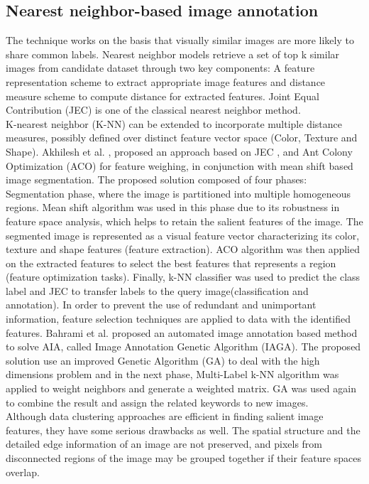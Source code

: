 \documentclass[conference]{IEEEtran}
\begin{document}
	\subsection{Nearest neighbor-based image annotation}
		The technique works on the basis that visually similar images are more likely to share
common labels. Nearest neighbor models retrieve a set of top k similar images from
candidate dataset through two key components: A feature representation scheme to
extract appropriate image features and distance measure scheme to compute distance for
extracted features. Joint Equal Contribution (JEC)\cite{b6} is one of the classical nearest neighbor method.\\
		
		K-nearest neighbor (K-NN) can be extended to incorporate multiple distance measures,
possibly defined over distinct feature vector space (Color, Texture and Shape). Akhilesh
et al. \cite{b7}, proposed an approach based on JEC \cite{b6}, and Ant Colony
Optimization (ACO) for feature weighing, in conjunction with mean shift based image
segmentation. The proposed solution composed of four phases: Segmentation phase, where
the image is partitioned into multiple homogeneous regions. Mean shift algorithm\cite{meanShift} was
used in this phase due to its robustness in feature space analysis, which
helps to retain the salient features of the image. The segmented image is represented as a
visual feature vector characterizing its color, texture and shape features (feature extraction).
ACO algorithm was then applied on the extracted features to select the best features that
represents a region (feature optimization tasks). Finally, k-NN classifier was used to predict
the class label and JEC to transfer labels to the query image(classification and annotation).
In order to prevent the use of redundant and unimportant information, feature selection
techniques are applied to data with the identified features. Bahrami et al.\cite{IAGA} proposed
an automated image annotation based method to solve AIA, called Image Annotation
Genetic Algorithm (IAGA). The proposed solution use an improved Genetic Algorithm
(GA) to deal with the high dimensions problem and in the next phase, Multi-Label k-NN
algorithm was applied to weight neighbors and generate a weighted matrix. GA was used
		again to combine the result and assign the related keywords to new images.\\
		
		Although data clustering approaches are efficient in finding salient image features,
they have some serious drawbacks as well. The spatial structure and the detailed edge
information of an image are not preserved, and pixels from disconnected regions of the
image may be grouped together if their feature spaces overlap.
	
\end{document}
